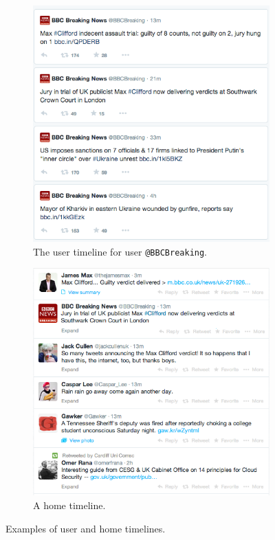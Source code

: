 \begin{figure}[h]
    \begin{subfigure}{.5\textwidth}
        \centering
        \includegraphics[scale=0.4]{2.Background/Media/user_timeline.png} 
        \caption{The user timeline for user \texttt{@BBCBreaking}.}
        \label{fig:user_timeline}
    \end{subfigure}
    \quad
    \begin{subfigure}{.5\textwidth}
         \centering
        \includegraphics[scale=0.42]{2.Background/Media/home_timeline.png} 
        \caption{A home timeline.}
        \label{fig:home_timeline}
    \end{subfigure}
    \caption{Examples of user and home timelines.}
    \label{fig:timelines}
\end{figure}

